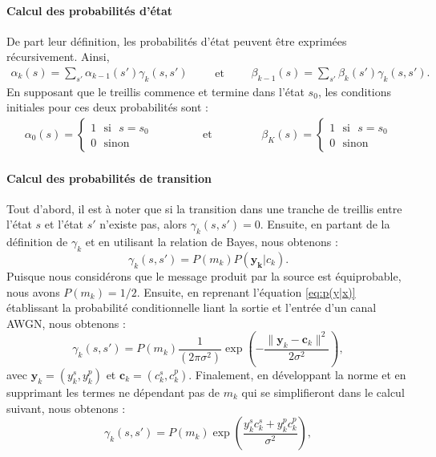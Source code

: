 \paragraph*{Calcul des probabilités d'état}
De part leur définition, les probabilités d'état peuvent être exprimées récursivement. Ainsi, 
\begin{equation}	\begin{split}
	\alpha_k(s)=\sum\limits_{s'}\alpha_{k-1}(s')\gamma_k(s,s')
	\end{split}\qquad\text{et}\qquad
	\begin{split}
		\beta_{k-1}(s)=\sum\limits_{s'}\beta_{k}(s')\gamma_k(s,s').
	\end{split} 
\end{equation}
En supposant que le treillis commence et termine dans l'état $s_0$, les conditions initiales pour ces deux probabilités sont : 
\[
	\begin{split}
		\alpha_0(s)=\begin{cases}
		1 \text{~~si~~} s = s_0 \\
		0 \text{~~sinon~~}
		\end{cases}
	\end{split}\qquad\qquad\text{et}\qquad\qquad
	\begin{split}
		\beta_K(s)=\begin{cases}
		1 \text{~~si~~} s = s_0 \\
		0 \text{~~sinon~~}
		\end{cases}
	\end{split}
\]
			
\paragraph*{Calcul des probabilités de transition} Tout d'abord, il est à noter que si la transition dans une tranche de 
treillis entre l'état $s$ et l'état $s'$ n'existe pas, alors $\gamma_k(s,s')=0.$
Ensuite, en partant de la définition de $\gamma_k$ et en utilisant la relation de Bayes, nous obtenons : 
\[\gamma_k(s,s') = P(m_k)P(\mathbf{y_k}|{c_k}).\]
Puisque nous considérons que le message produit par la source est équiprobable, nous avons $P(m_k) = 1/2$. Ensuite, en 
reprenant l'équation \ref{eq:p(y|x)} établissant la probabilité conditionnelle liant la sortie et l'entrée d'un canal AWGN, 
nous obtenons : 
\begin{equation*}
	\gamma_k(s,s') = P(m_k)\frac{1}{(2\pi\sigma^2)} \exp \left(-\frac{\|\mathbf{y}_k-\mathbf{c}_k\|^2}{2 \sigma^2}\right),
\end{equation*}
avec $\mathbf{y}_k = (y^s_k, y^p_k)$ et $\mathbf{c}_k = (c^s_k, c^p_k)$. Finalement, en développant la norme et en supprimant 
les termes ne dépendant pas de $m_k$ qui se simplifieront dans le calcul suivant, nous obtenons : 
\begin{equation}	\label{eq:llr}
	\gamma_k(s,s') = P(m_k) \exp \left(\frac{y^s_k c^s_k + y^p_k c^p_k}{\sigma^2}\right),
\end{equation}

